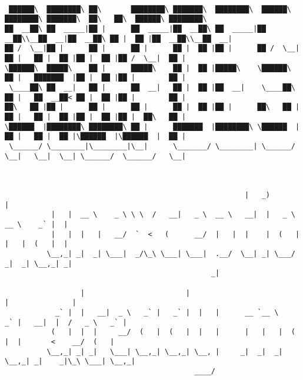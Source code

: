 \documentclass[varwidth=\maxdimen,margin=0.5cm,multi={verbatim}]{standalone}
\begin{document}
\begin{verbatim}

 ██████\  ████████\ ██\       ████████\ ███████\  ████████\  ██████\ ████████\ ███████\  ██\   ██\  ██████\ ████████\
██  __██\ ██  _____|██ |      ██  _____|██  __██\ ██  _____|██  __██\\__██  __|██  __██\ ██ |  ██ |██  __██\\__██  __|
██ /  \__|██ |      ██ |      ██ |      ██ |  ██ |██ |      ██ /  \__|  ██ |   ██ |  ██ |██ |  ██ |██ /  \__|  ██ |
\██████\  █████\    ██ |      █████\    ██ |  ██ |█████\    \██████\    ██ |   ███████  |██ |  ██ |██ |        ██ |
 \____██\ ██  __|   ██ |      ██  __|   ██ |  ██ |██  __|    \____██\   ██ |   ██  __██< ██ |  ██ |██ |        ██ |
██\   ██ |██ |      ██ |      ██ |      ██ |  ██ |██ |      ██\   ██ |  ██ |   ██ |  ██ |██ |  ██ |██ |  ██\   ██ |
\██████  |████████\ ████████\ ██ |      ███████  |████████\ \██████  |  ██ |   ██ |  ██ |\██████  |\██████  |  ██ |
 \______/ \________|\________|\__|      \_______/ \________| \______/   \__|   \__|  \__| \______/  \______/   \__|



                                                         |   _)                       |
           |   |  __ \    _ \ \ \  /   __|   _ \  __ \   __|  |   _ \   __ \    _` |  |
           |   |  |   |   __/  `  <   (      __/  |   |  |    |  (   |  |   |  (   |  |
          \__,_| _|  _| \___|  _/\_\ \___| \___|  .__/  \__| _| \___/  _|  _| \__,_| _|
                                                 _|

                  |                        |                                     |               |
            _` |  |   __|  _ \   _` |   _` |  |   |      __ `__ \    _` |   __|  |  /   _ \   _` |
           (   |  |  |     __/  (   |  (   |  |   |      |   |   |  (   |  |       <    __/  (   |
          \__,_| _| _|   \___| \__,_| \__,_| \__, |     _|  _|  _| \__,_| _|    _|\_\ \___| \__,_|
                                             ____/



\end{verbatim}
\end{document}
